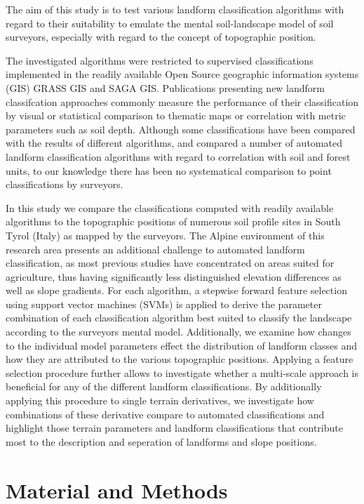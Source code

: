 \documentclass[final,1p,times,twocolumn,authoryear]{elsarticle}
\begin{document}
The aim of this study is to test various landform classification algorithms with regard to their suitability to emulate the mental soil-landscape model of soil surveyors, especially with regard to the concept of topographic position.

The investigated algorithms were restricted to supervised classifications implemented in the readily available Open Source geographic information systems (GIS) GRASS GIS and SAGA GIS. Publications presenting new landform classifcation approaches commonly measure the performance of their classification by visual or statistical comparison to thematic maps or correlation with metric parameters such as soil depth. Although some classifications have been compared with the results of different algorithms, and \cite{Barka2011} compared a number of automated landform classification algorithms with regard to correlation with soil and forest units, to our knowledge there has been no systematical comparison to point classifications by surveyors. 
 
In this study we compare the classifications computed with readily available algorithms to the topographic positions of numerous soil profile sites in South Tyrol (Italy) as mapped by the surveyors. The Alpine environment of this research area presents an additional challenge to automated landform classification, as most previous studies have concentrated on areas suited for agriculture, thus having significantly less distinguished elevation differences as well as slope gradients. For each algorithm, a stepwise forward feature selection using support vector machines (SVMs) is applied to derive the parameter combination of each classification algorithm best suited to classify the landscape according to the surveyors mental model. Additionally, we examine how changes to the individual model parameters effect the distribution of landform classes and how they are attributed to the various topographic positions. Applying a feature selection procedure further allows to investigate whether a multi-scale approach is beneficial for any of the different landform classifications. By additionally applying this procedure to single terrain derivatives, we investigate how combinations of these derivative compare to automated classifications and highlight those terrain parameters and landform classifications that contribute most to the description and seperation of landforms and slope positions.
\section{Material and Methods}
\end{document}
